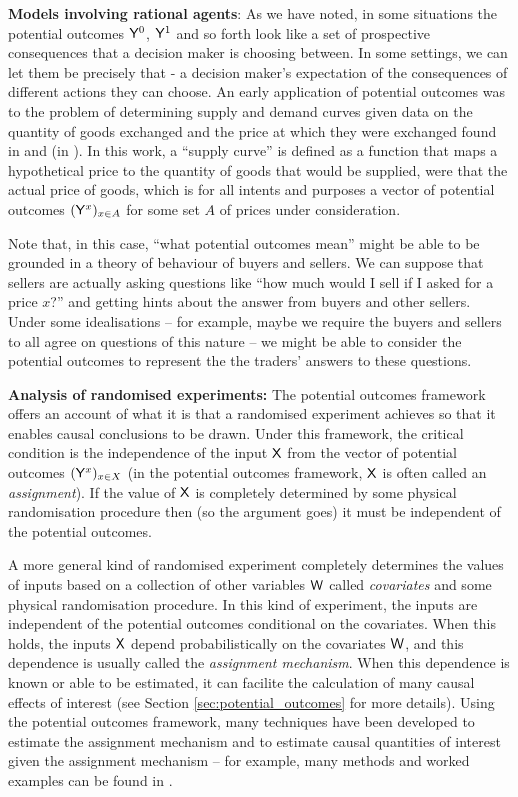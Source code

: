 \textbf{Models involving rational agents}: As we have noted, in some situations the potential outcomes $\mathsf{Y}^0$, $\mathsf{Y}^1$ and so forth look like a set of prospective consequences that a decision maker is choosing between. In some settings, we can let them be precisely that - a decision maker's expectation of the consequences of different actions they can choose. An early application of potential outcomes was to the problem of determining supply and demand curves given data on the quantity of goods exchanged and the price at which they were exchanged found in \citet{tinbergen1997determination} and \citet{haavelmo_statistical_1943} (in \citep[ch. ~20]{hendry_foundations_1997}). In this work, a ``supply curve'' is defined as a function that maps a hypothetical price to the quantity of goods that would be supplied, were that the actual price of goods, which is for all intents and purposes a vector of potential outcomes $(\mathsf{Y}^x)_{x\in A}$ for some set $A$ of prices under consideration. 

Note that, in this case, ``what potential outcomes mean'' might be able to be grounded in a theory of behaviour of buyers and sellers. We can suppose that sellers are actually asking questions like ``how much would I sell if I asked for a price $x$?'' and getting hints about the answer from buyers and other sellers. Under some idealisations -- for example, maybe we require the buyers and sellers to all agree on questions of this nature -- we might be able to consider the potential outcomes to represent the the traders' answers to these questions.

\textbf{Analysis of randomised experiments:} The potential outcomes framework offers an account of what it is that a randomised experiment achieves so that it enables causal conclusions to be drawn. Under this framework, the critical condition is the independence of the input $\mathsf{X}$ from the vector of potential outcomes $(\mathsf{Y}^x)_{x\in X}$ (in the potential outcomes framework, $\mathsf{X}$ is often called an \emph{assignment}). If the value of $\mathsf{X}$ is completely determined by some physical randomisation procedure then (so the argument goes) it must be independent of the potential outcomes. 

A more general kind of randomised experiment completely determines the values of inputs based on a collection of other variables $\mathsf{W}$ called \emph{covariates} and some physical randomisation procedure. In this kind of experiment, the inputs are independent of the potential outcomes conditional on the covariates. When this holds, the inputs $\mathsf{X}$ depend probabilistically on the covariates $\mathsf{W}$, and this dependence is usually called the \emph{assignment mechanism}. When this dependence is known or able to be estimated, it can facilite the calculation of many causal effects of interest (see Section \ref{sec:potential_outcomes} for more details). Using the potential outcomes framework, many techniques have been developed to estimate the assignment mechanism and to estimate causal quantities of interest given the assignment mechanism -- for example, many methods and worked examples can be found in \citet{imbens_causal_2015}.


